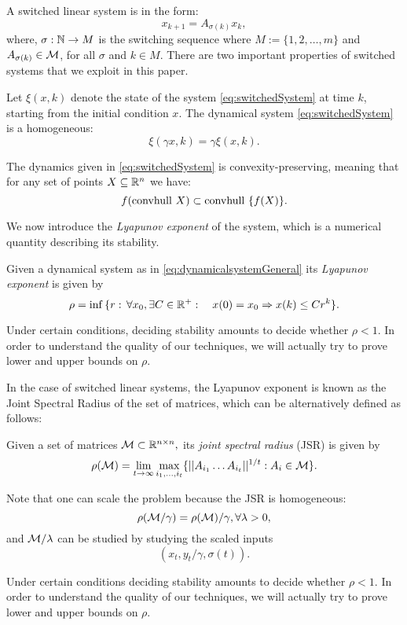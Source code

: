 A switched linear system is in the form:
\begin{equation}\label{eq:switchedSystem}x_{k+1} = A_{\sigma(k)}x_k,\end{equation}
where, $\sigma: \mathbb{N} \to M$ is the switching sequence where $M := \{1,2,\dots,m\}$ and $A_{\sigma(k)} \in \mathcal{M}$, for all $\sigma$ and $k \in M$. There are two important properties of switched systems that we exploit in this paper.
\begin{property}\label{property:homogeneity}
Let $\xi(x, k)$ denote the state of the system \eqref{eq:switchedSystem} at time $k$, starting from the initial condition $x$. The dynamical system \eqref{eq:switchedSystem} is a homogeneous:
$$\xi(\gamma x, k)= \gamma \xi(x, k). $$
\end{property}
\begin{property}\label{property:convpres}
The dynamics given in \eqref{eq:switchedSystem} is convexity-preserving, meaning that for any set of points $X \subseteq \mathbb{R}^n$ we have:
$$ f(\mbox{convhull }{X})\subset \mbox{convhull }\{f(X)\}. $$
\end{property}

We now introduce the \emph{Lyapunov exponent} of the system, which is a numerical quantity describing its stability.
\begin{definition}   Given a dynamical system as in \eqref{eq:dynamicalsystemGeneral} its \emph{Lyapunov exponent} is given by
$$\rho =\inf{\{r:\,\forall x_0, \exists C\in \mathbb{R}^+: \quad x(0)=x_0 \Rightarrow x(k)\leq Cr^k\}}. $$
\end{definition}
Under certain conditions, deciding stability amounts to decide whether $\rho<1.$  In order to understand the quality of our techniques, we will actually try to prove lower and upper bounds on $\rho.$ 

In the case of switched linear systems, the Lyapunov exponent is known as the Joint Spectral Radius of the set of matrices, which can be alternatively defined as follows:
\begin{definition} \cite{jungers_lncis} Given a set of matrices $\mathcal{M} \subset \mathbb{R}^{n\times n},$ its \emph{joint spectral radius} (JSR) is given by
$$\rho(\mathcal{M}) =\lim_{t\rightarrow \infty} \max_{i_1,\dots, i_t}\{||A_{i_1} \dots A_{i_t}||^{1/t}: A_i\in\mathcal{M}\}. $$
\end{definition}

\begin{remark}\label{rem:scaling}
 Note that one can scale the problem because the JSR is homogeneous:
$$\rho(\mathcal{M}/\gamma)=\rho(\mathcal{M})/\gamma, \forall \lambda>0, $$ and $\mathcal{M}/\lambda$ can be studied by studying the scaled inputs $$(x_t, y_t/\gamma,\sigma(t)).$$
\end{remark}

Under certain conditions deciding stability amounts to decide whether $\rho<1.$  In order to understand the quality of our techniques, we will actually try to prove lower and upper bounds on $\rho.$ 
